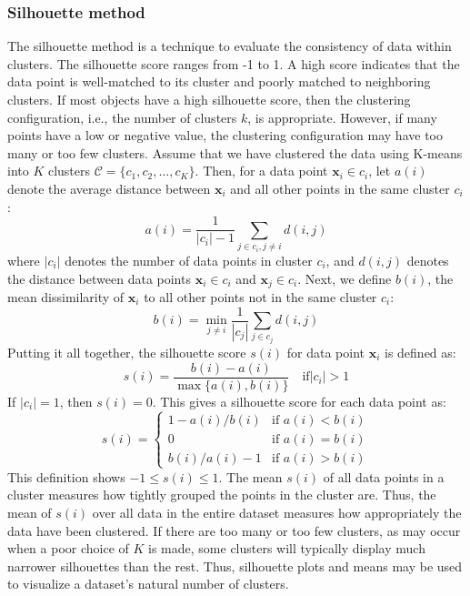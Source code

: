 \documentclass{article}[11pt]
\begin{document}
\subsubsection*{Silhouette method}
The silhouette method is a technique to evaluate the consistency of data within clusters.
The silhouette score ranges from -1 to 1. A high score indicates that the data point is well-matched to its cluster and poorly matched to neighboring clusters.
If most objects have a high silhouette score, then the clustering configuration, i.e., the number of clusters $k$, is appropriate. 
However, if many points have a low or negative value, the clustering configuration may have too many or too few clusters.
Assume that we have clustered the data using K-means into $K$ clusters $\mathcal{C} = \{c_1, c_2, \ldots, c_K\}$.
Then, for a data point $\mathbf{x}_i\in c_i$, let $a(i)$ denote the average distance between $\mathbf{x}_i$ and all other points in the same cluster $c_i$:
\begin{equation}
a(i) = \frac{1}{|c_i| - 1}\sum_{j\in c_i, j\neq i}d(i,j)
\end{equation}
where $|c_i|$ denotes the number of data points in cluster $c_i$, and $d(i,j)$ denotes the distance between data points $\mathbf{x}_i\in{c_{i}}$ and $\mathbf{x}_j\in{c_{i}}$.
Next, we define $b(i)$, the mean dissimilarity of $\mathbf{x}_i$ to all other points not in the same cluster $c_i$:
\begin{equation}
b(i) = \min_{j\neq i}\frac{1}{|c_j|}\sum_{j\in c_j}d(i,j)
\end{equation}
Putting it all together, the silhouette score $s(i)$ for data point $\mathbf{x}_i$ is defined as:
\begin{equation}
s(i) = \frac{b(i) - a(i)}{\max\{a(i), b(i)\}}\quad\text{if}|c_i|>1
\end{equation}
If $|c_i|=1$, then $s(i)=0$. This gives a silhouette score for each data point as:
\begin{equation}
   s(i) =
   \begin{cases}
      1 - a(i)/b(i) & \text{if } a(i) < b(i)\\ 
      0 & \text{if } a(i) = b(i)\\
      b(i)/a(i) - 1 & \text{if } a(i) > b(i)
   \end{cases}
\end{equation}
This definition shows $-1\leq s(i)\leq 1$. 
The mean $s(i)$ of all data points in a cluster measures how tightly grouped the points in the cluster are.
Thus, the mean of $s(i)$ over all data in the entire dataset measures how appropriately the data have been clustered.
If there are too many or too few clusters, as may occur when a poor choice of $K$ is made, some clusters will typically display much narrower silhouettes than the rest. 
Thus, silhouette plots and means may be used to visualize a dataset's natural number of clusters.
\end{document}
